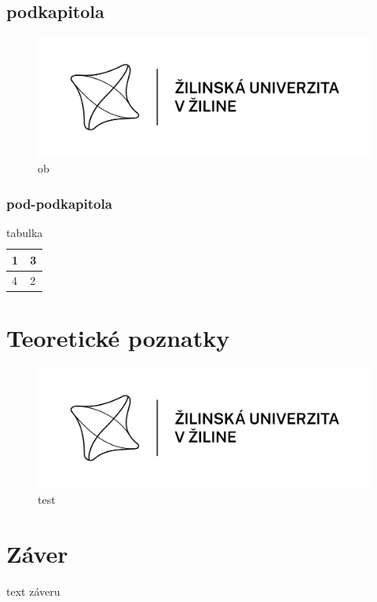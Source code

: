\documentclass[12pt]{article}
\begin{document}
\subsection{podkapitola}
\begin{figure}[H] %
\centering
\includegraphics{logo}
\caption{ob}
\label{img:ob}
\end{figure}
\subsubsection{pod-podkapitola}
\begin{table}[H]
	\centering
	\caption{tabulka}
	\label{tab:my-table}
	\begin{tabular}{|l|l|}
\hline
1 & 3 \\ \hline
4 & 2 \\ \hline
	\end{tabular}	
	\end{table}
\section{Teoretické poznatky}
\begin{figure}[H] %
\centering
\includegraphics{logo}
\caption{test}
\label{img:test}
\end{figure}


\newpage %
\section*{Záver}
text záveru
\end{document}
